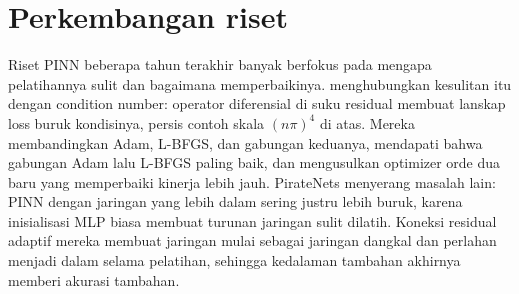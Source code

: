 \section{Perkembangan riset}

Riset PINN beberapa tahun terakhir banyak berfokus pada mengapa pelatihannya sulit dan bagaimana memperbaikinya.
\citet{rathore2024} menghubungkan kesulitan itu dengan condition number: operator diferensial di suku residual membuat
lanskap loss buruk kondisinya, persis contoh skala $(n\pi)^4$ di atas. Mereka membandingkan Adam, L-BFGS, dan gabungan
keduanya, mendapati bahwa gabungan Adam lalu L-BFGS paling baik, dan mengusulkan optimizer orde dua baru yang memperbaiki
kinerja lebih jauh. PirateNets \citep{wang2024pirate} menyerang masalah lain: PINN dengan jaringan yang lebih dalam sering
justru lebih buruk, karena inisialisasi MLP biasa membuat turunan jaringan sulit dilatih. Koneksi residual adaptif mereka
membuat jaringan mulai sebagai jaringan dangkal dan perlahan menjadi dalam selama pelatihan, sehingga kedalaman tambahan
akhirnya memberi akurasi tambahan.


